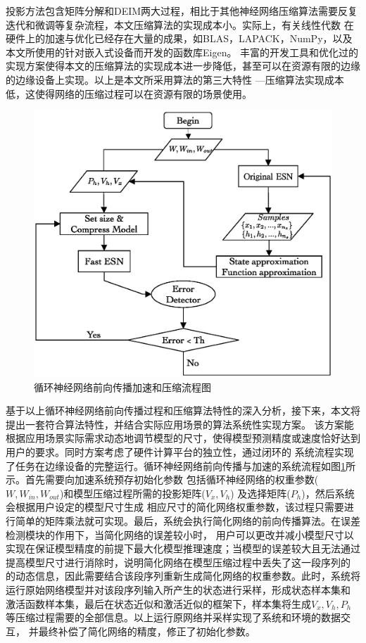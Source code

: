 投影方法包含矩阵分解和DEIM两大过程，相比于其他神经网络压缩算法需要反复迭代和微调等复杂流程，本文压缩算法的实现成本小。实际上，有关线性代数
在硬件上的加速与优化已经存在大量的成果，如BLAS\citing{}，LAPACK\citing{}，NumPy\citing{}，以及本文所使用的针对嵌入式设备而开发的函数库Eigen\citing{}。
丰富的开发工具和优化过的实现方案使得本文的压缩算法的实现成本进一步降低，甚至可以在资源有限的边缘的边缘设备上实现。以上是本文所采用算法的第三大特性
---压缩算法实现成本低，这使得网络的压缩过程可以在资源有限的场景使用。
\begin{figure}
	\centering
	\includegraphics[width=0.6\columnwidth]{exp/Flowchart_diagram.eps}
	\caption{循环神经网络前向传播加速和压缩流程图}
	\label{fig:flowchart}
\end{figure}

基于以上循环神经网络前向传播过程和压缩算法特性的深入分析，接下来，本文将提出一套符合算法特性，并结合实际应用场景的算法系统性实现方案。
该方案能根据应用场景实际需求动态地调节模型的尺寸，使得模型预测精度或速度恰好达到用户的要求。同时方案考虑了硬件计算平台的独立性，通过闭环的
系统流程实现了任务在边缘设备的完整运行。循环神经网络前向传播与加速的系统流程如图\ref{fig:flowchart}所示。首先需要向加速系统预存初始化参数
包括循环神经网络的权重参数(\(W,W_{in},W_{out}\))和模型压缩过程所需的投影矩阵(\(V_x,V_h\)) 及选择矩阵(\(P_h\))，然后系统会根据用户设定的模型尺寸生成
相应尺寸的简化网络权重参数，该过程只需要进行简单的矩阵乘法就可实现。最后，系统会执行简化网络的前向传播算法。在误差检测模块的作用下，当简化网络的误差较小时，
用户可以更改并减小模型尺寸以实现在保证模型精度的前提下最大化模型推理速度；当模型的误差较大且无法通过提高模型尺寸进行消除时，说明简化网络在模型压缩过程中丢失了这一段序列的
的动态信息，因此需要结合该段序列重新生成简化网络的权重参数。此时，系统将运行原始网络模型并对该段序列输入所产生的状态进行采样，形成状态样本集和
激活函数样本集，最后在状态近似和激活近似的框架下，样本集将生成\(V_x,V_h,P_h\)等压缩过程需要的全部信息。以上运行原网络并采样实现了系统和环境的数据交互，
并最终补偿了简化网络的精度，修正了初始化参数。
